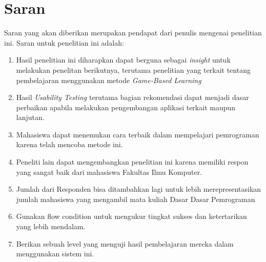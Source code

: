 \section{Saran}
Saran yang akan diberikan merupakan pendapat dari penulis mengenai penelitian ini. Saran untuk penelitian ini adalah:
\begin{enumerate}
	\item Hasil penelitian ini diharapkan dapat berguna sebagai \textit{insight} untuk melakukan penelitan berikutnya, terutama penelitian yang terkait tentang pembelajaran menggunakan metode \textit{Game-Based Learning}
	\item Hasil \textit{Usability Testing} terutama bagian rekomendasi dapat menjadi dasar perbaikan apabila melakukan pengembangan aplikasi terkait maupun lanjutan.
	\item Mahasiswa dapat menemukan cara terbaik dalam mempelajari pemrograman karena telah mencoba metode ini.
	\item Peneliti lain dapat mengembangkan penelitian ini karena memiliki respon yang sangat baik dari mahasiswa Fakultas Ilmu Komputer.
	\item Jumlah dari Responden bisa ditambahkan lagi untuk lebih merepresentasikan jumlah mahasiswa yang mengambil mata kuliah Dasar Dasar Pemrograman
	\item Gunakan flow condition untuk mengukur tingkat sukses dan ketertarikan yang lebih mendalam.
	\item Berikan sebuah level yang menguji hasil pembelajaran mereka dalam menggunakan sistem ini.
\end{enumerate}

